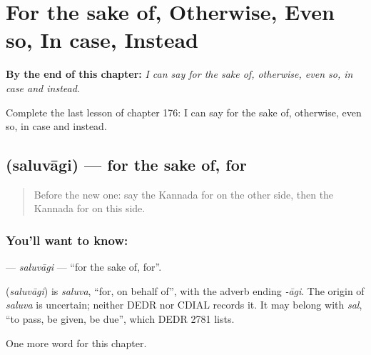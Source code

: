 
\chapter{For the sake of, Otherwise, Even so, In case, Instead}
\label{ch:ka-for-the-sake-of-otherwise-even-so-in-case-instead}

\begin{chapteropening}
\textbf{By the end of this chapter:} \emph{I can say for the sake of, otherwise, even so, in case and instead.}

Complete the last lesson of chapter 176: I can say for the sake of, otherwise, even so, in case and instead.
\end{chapteropening}

\section[\texorpdfstring{\kn{ಸಲುವಾಗಿ} (saluvāgi)}{ಸಲುವಾಗಿ (saluvāgi)}]{ (saluvāgi) — for the sake of, for}

\label{lesson:KA-C176-saluvagi}



\begin{quote}
Before the new one: say the Kannada for on the other side, then the Kannada for on this side.
\end{quote}

\subsection*{You'll want to know: }
\textbf{} — \emph{saluvāgi} — \textquotedblleft{}for the sake of, for\textquotedblright{}.

\begin{cousinweb}
\textbf{} (\emph{saluvāgi}) is \emph{saluva}, \textquotedblleft{}for, on behalf of\textquotedblright{}, with the adverb ending \emph{-āgi}. The origin of \emph{saluva} is uncertain; neither DEDR nor CDIAL records it. It may belong with \emph{sal}, \textquotedblleft{}to pass, be given, be due\textquotedblright{}, which DEDR 2781 lists.
\end{cousinweb}

\begin{grammarlens}[title={What you've built}]
One more word for this chapter.
\end{grammarlens}


